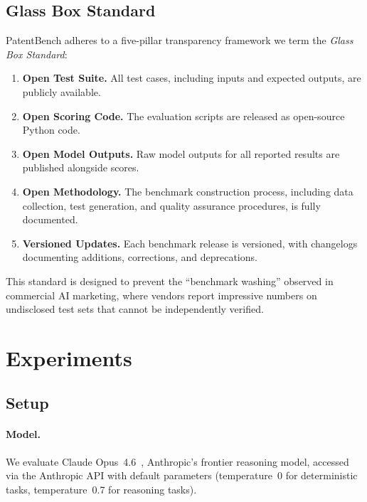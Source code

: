 \documentclass[11pt]{article}
\begin{document}
\subsection{Glass Box Standard}
\label{sec:glassbox}

PatentBench adheres to a five-pillar transparency framework we term the \emph{Glass Box Standard}:

\begin{enumerate}[leftmargin=*]
    \item \textbf{Open Test Suite.} All test cases, including inputs and expected outputs, are publicly available.
    \item \textbf{Open Scoring Code.} The evaluation scripts are released as open-source Python code.
    \item \textbf{Open Model Outputs.} Raw model outputs for all reported results are published alongside scores.
    \item \textbf{Open Methodology.} The benchmark construction process, including data collection, test generation, and quality assurance procedures, is fully documented.
    \item \textbf{Versioned Updates.} Each benchmark release is versioned, with changelogs documenting additions, corrections, and deprecations.
\end{enumerate}

This standard is designed to prevent the ``benchmark washing'' observed in commercial AI marketing, where vendors report impressive numbers on undisclosed test sets that cannot be independently verified.

\section{Experiments}
\label{sec:experiments}

\subsection{Setup}
\label{sec:setup}

\paragraph{Model.} We evaluate Claude Opus~4.6~\citep{anthropic2025claude}, Anthropic's frontier reasoning model, accessed via the Anthropic API with default parameters (temperature~0 for deterministic tasks, temperature~0.7 for reasoning tasks).
\end{document}
